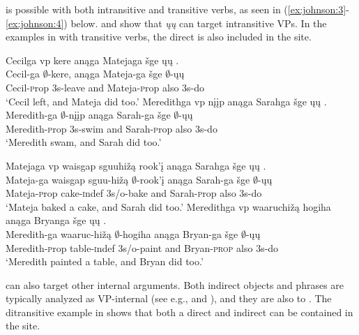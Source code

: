 \documentclass[output=paper]{LSP/langsci}
\begin{document}
 is possible with both intransitive and transitive verbs, as seen in (\ref{ex:johnson:3}-\ref{ex:johnson:4}) below.  and  show that \emph{ųų} can target intransitive VPs. In the examples in  with transitive verbs, the direct  is also included in the  site.
 
\ea\label{ex:johnson:3}
\ea\label{ex:johnson:3a} 
\glll Cecilga {\ob}{vp} kere{\cb} anąga Matejaga šge {\ob}ųų{\cb} .\\
Cecil-ga {} $\emptyset$-kere, anąga Mateja-ga šge $\emptyset$-ųų\\
Cecil-{\textsc prop} {} {\textsc 3s}-leave and Mateja-{\textsc prop} also {\textsc 3s}-do\\
\trans `Cecil left, and Mateja did too.' 
\ex\label{ex:johnson:3b} 
\glll Meredithga {\ob}{vp} nįįp{\cb} anąga Sarahga šge {\ob}ųų{\cb} .\\
Meredith-ga {} $\emptyset$-nįįp anąga Sarah-ga šge $\emptyset$-ųų\\
Meredith-{\textsc prop} {} {\textsc 3s}-swim and Sarah-{\textsc prop} also {\textsc 3s}-do\\
\trans `Meredith swam, and Sarah did too.'
\z
\z
 
\ea\label{ex:johnson:4}
\ea\label{ex:johnson:4a} 
\glll Matejaga {\ob}{vp} {waisgap sguuhižą} rook'į{\cb} anąga Sarahga šge {\ob}ųų{\cb} .\\
Mateja-ga {} {waisgap sguu-hižą} $\emptyset$-rook'į anąga Sarah-ga šge $\emptyset$-ųų\\
Mateja-{\textsc prop} {} cake-{\textsc indef} {\textsc 3s/o}-bake and Sarah-{\textsc prop} also {\textsc 3s}-do\\
\trans `Mateja baked a cake, and Sarah did too.' 
\ex\label{ex:johnson:4b} 
\glll Meredithga {\ob}{vp} waaruchižą hogiha{\cb} anąga Bryanga šge {\ob}ųų{\cb} .\\
Meredith-ga {} waaruc-hižą $\emptyset$-hogiha anąga Bryan-ga šge $\emptyset$-ųų\\
Meredith-{\textsc prop} {} table-{\textsc indef} {\textsc 3s/o}-paint and Bryan-\textsc{prop} also {\textsc 3s}-do\\
\trans `Meredith painted a table, and Bryan did too.'
\z
\z

 can also target other internal arguments. Both indirect objects and  phrases are typically analyzed as VP-internal (see e.g., \citealt{Larson1988} and \citealt{LevinRappaportHovav1995}), and they are also  to . The ditransitive example in  shows that both a direct  and indirect  can be contained in the  site.
\end{document}
